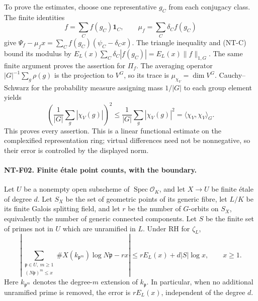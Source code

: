 \documentclass[11pt,a4paper]{article}
\begin{document}
To prove the estimates, choose one representative $g_C$ from each
conjugacy class.  The finite identities
\[
 f=\sum_C f(g_C)\mathbf1_C,
 \qquad \mu_f=\sum_C\delta_Cf(g_C)
\]
give $\Psi_f-\mu_fx=\sum_Cf(g_C)(\psi_C-\delta_Cx)$.
The triangle inequality and (NT-C) bound its modulus by
$E_L(x)\sum_C\delta_C|f(g_C)|=E_L(x)\|f\|_{1,G}$.
The same finite argument proves the assertion for $\Pi_f$.
The averaging operator $|G|^{-1}\sum_g\rho(g)$ is the projection to $V^G$,
so its trace is $\mu_{\chi_V}=\dim V^G$.  Cauchy--Schwarz for the
probability measure assigning mass $1/|G|$ to each group element yields
\[
 \left(\frac1{|G|}\sum_g|\chi_V(g)|\right)^2
 \le\frac1{|G|}\sum_g|\chi_V(g)|^2
 =\langle\chi_V,\chi_V\rangle_G.
\]
This proves every assertion.  This is a linear functional estimate on the
complexified representation ring; virtual differences need not be
nonnegative, so their error is controlled by the displayed norm.

\paragraph{NT-F02. Finite \texorpdfstring{\'{e}}{e}tale point counts, with the boundary.}
Let $U$ be a nonempty open subscheme of
$\operatorname{Spec}\mathcal O_K$, and let $X\to U$ be finite \'{e}tale
of degree $d$.  Let $S_X$ be the set of geometric points of its generic
fibre, let $L/K$ be its finite Galois splitting field, and let $r$ be the
number of $G$-orbits on $S_X$, equivalently the number of generic connected
components.  Let $S$ be the finite set of primes not in $U$ which are
unramified in $L$.  Under RH for $\zeta_L$,
\[
 \left|\sum_{\substack{\mathfrak p\in U,\ m\ge1\\(N\mathfrak p)^m\le x}}
       \#X(k_{\mathfrak p^m})\log N\mathfrak p-rx\right|
 \le rE_L(x)+d|S|\log x,\qquad x\ge1.
\tag{NT-F02}
\]
Here $k_{\mathfrak p^m}$ denotes the degree-$m$ extension of
$k_{\mathfrak p}$.  In particular, when no additional unramified prime is
removed, the error is $rE_L(x)$, independent of the degree $d$.
\end{document}
